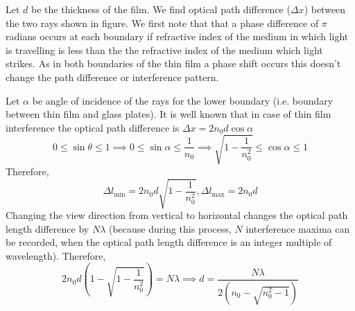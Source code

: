\begin{custom-simple}[Problem 15]
Let $d$ be the thickness of the film. We find optical path difference ($\Delta x$) between the two rays shown in figure. We first note that that a phase difference of $\pi$ radians occurs at each boundary if refractive index of the medium in which light is travelling is less than the the refractive index of the medium which light strikes. As in both boundaries of the thin film a phase shift occurs this doesn't change the path difference or interference pattern.

Let $\alpha$ be angle of incidence of the rays for the lower boundary (i.e. boundary between thin film and glass plates). It is well known that in case of thin film interference the optical path difference is  $\Delta x = 2n_0d\cos \alpha$
\vspace{3mm}
\[0\leq \sin \theta \leq 1 \implies 0 \leq \sin \alpha \leq \frac{1}{n_0}\implies \sqrt{1-\frac{1}{n_0^2}} \leq \cos \alpha \leq 1\]
Therefore,
\[\Delta l_ {\text{min}} = 2n_0d\sqrt{1-\frac{1}{n_0^2}}, \Delta l_{\text {max}} = 2n_0 d\] 
Changing the view direction from vertical to horizontal changes the optical path length difference by $N\lambda$ (because during this process, $N$ interference maxima can be recorded, when the optical path length difference is an integer multiple of wavelength). Therefore,
$$2n_0d\left(1-\sqrt{1-\frac{1}{n_0^2}}\right) = N\lambda \implies \boxed {d =\frac{N\lambda}{2(n_0 - \sqrt{n_0^2 - 1})}}$$
\end{custom-simple}